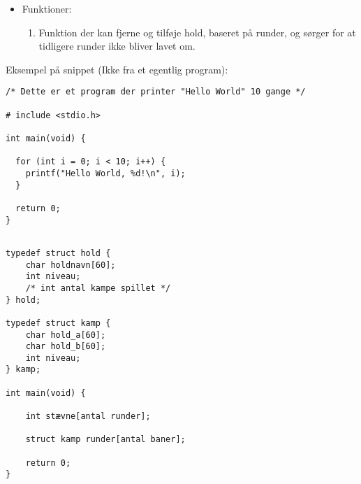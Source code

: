 \begin{itemize}
    \item Funktioner:
    \begin{enumerate}
        \item Funktion der kan fjerne og tilføje hold, baseret på runder, og sørger for at tidligere runder ikke bliver lavet om. 
    \end{enumerate}
    
\end{itemize}



Eksempel på snippet (Ikke fra et egentlig program):
\begin{verbatim}
/* Dette er et program der printer "Hello World" 10 gange */

# include <stdio.h>

int main(void) {
    
  for (int i = 0; i < 10; i++) {
    printf("Hello World, %d!\n", i);
  }
     
  return 0;
} 
\end{verbatim}

 
\begin{verbatim}

typedef struct hold {
    char holdnavn[60];
    int niveau;
    /* int antal kampe spillet */
} hold;

typedef struct kamp {
    char hold_a[60];
    char hold_b[60];
    int niveau;
} kamp;

int main(void) {

    int stævne[antal runder];
    
    struct kamp runder[antal baner];

    return 0;
}
\end{verbatim}



